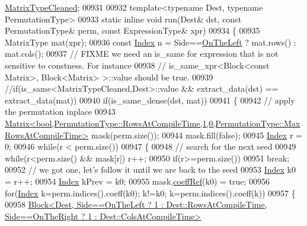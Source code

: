 \begin{DoxyCode}
      \hyperlink{group___sparse_core___module}{MatrixTypeCleaned};
00931 
00932     \textcolor{keyword}{template}<\textcolor{keyword}{typename} Dest, \textcolor{keyword}{typename} PermutationType>
00933     \textcolor{keyword}{static} \textcolor{keyword}{inline} \textcolor{keywordtype}{void} run(Dest& dst, \textcolor{keyword}{const} PermutationType& perm, \textcolor{keyword}{const} ExpressionType& xpr)
00934     \{
00935       MatrixType mat(xpr);
00936       \textcolor{keyword}{const} \hyperlink{namespace_eigen_a62e77e0933482dafde8fe197d9a2cfde}{Index} n = Side==\hyperlink{group__enums_ggac22de43beeac7a78b384f99bed5cee0ba129609b3bdf23b071f5f86cf2f995ec4}{OnTheLeft} ? mat.rows() : mat.cols();
00937       \textcolor{comment}{// FIXME we need an is\_same for expression that is not sensitive to constness. For instance}
00938       \textcolor{comment}{// is\_same\_xpr<Block<const Matrix>, Block<Matrix> >::value should be true.}
00939       \textcolor{comment}{//if(is\_same<MatrixTypeCleaned,Dest>::value && extract\_data(dst) == extract\_data(mat))}
00940       \textcolor{keywordflow}{if}(is\_same\_dense(dst, mat))
00941       \{
00942         \textcolor{comment}{// apply the permutation inplace}
00943         
      \hyperlink{group___core___module_class_eigen_1_1_matrix}{Matrix<bool,PermutationType::RowsAtCompileTime,1,0,PermutationType::MaxRowsAtCompileTime>}
       mask(perm.size());
00944         mask.fill(\textcolor{keyword}{false});
00945         \hyperlink{namespace_eigen_a62e77e0933482dafde8fe197d9a2cfde}{Index} r = 0;
00946         \textcolor{keywordflow}{while}(r < perm.size())
00947         \{
00948           \textcolor{comment}{// search for the next seed}
00949           \textcolor{keywordflow}{while}(r<perm.size() && mask[r]) r++;
00950           \textcolor{keywordflow}{if}(r>=perm.size())
00951             \textcolor{keywordflow}{break};
00952           \textcolor{comment}{// we got one, let's follow it until we are back to the seed}
00953           \hyperlink{namespace_eigen_a62e77e0933482dafde8fe197d9a2cfde}{Index} k0 = r++;
00954           \hyperlink{namespace_eigen_a62e77e0933482dafde8fe197d9a2cfde}{Index} kPrev = k0;
00955           mask.\hyperlink{class_eigen_1_1_plain_object_base_a25626a55b26a4323565f79d1b7c48ea8}{coeffRef}(k0) = \textcolor{keyword}{true};
00956           \textcolor{keywordflow}{for}(\hyperlink{namespace_eigen_a62e77e0933482dafde8fe197d9a2cfde}{Index} k=perm.indices().coeff(k0); k!=k0; k=perm.indices().coeff(k))
00957           \{
00958                   
      \hyperlink{group___core___module_class_eigen_1_1_block}{Block<Dest, Side==OnTheLeft ? 1 : Dest::RowsAtCompileTime, Side==OnTheRight ? 1 : Dest::ColsAtCompileTime>}

\end{DoxyCode}
